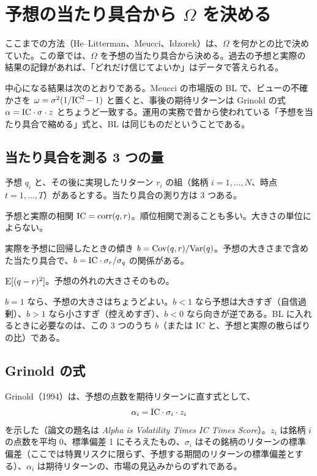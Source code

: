 \chapter{予想の当たり具合から $\Omega$ を決める}\label{ch:accuracy}

ここまでの方法（He--Litterman、Meucci、Idzorek）は、$\Omega$ を何かとの比で決めていた。この章では、$\Omega$ を予想の当たり具合から決める。過去の予想と実際の結果の記録があれば、「どれだけ信じてよいか」はデータで答えられる。

中心になる結果は次のとおりである。Meucci の市場版の BL で、ビューの不確かさを $\omega=\sigma^2(1/\mathrm{IC}^2-1)$ と置くと、事後の期待リターンは Grinold の式 $\alpha=\mathrm{IC}\cdot\sigma\cdot z$ とちょうど一致する。運用の実務で昔から使われている「予想を当たり具合で縮める」式と、BL は同じものだということである。

\section{当たり具合を測る 3 つの量}

予想 $q_i$ と、その後に実現したリターン $r_i$ の組（銘柄 $i=1,\dots,N$、時点 $t=1,\dots,T$）があるとする。当たり具合の測り方は 3 つある。

\begin{description}[leftmargin=2em,style=nextline]
\item[情報係数（IC）] 予想と実際の相関 $\mathrm{IC}=\mathrm{corr}(q,r)$。順位相関で測ることも多い。大きさの単位によらない。
\item[較正の傾き $b$] 実際を予想に回帰したときの傾き $b=\mathrm{Cov}(q,r)/\mathrm{Var}(q)$。予想の大きさまで含めた当たり具合で、$b=\mathrm{IC}\cdot\sigma_r/\sigma_q$ の関係がある。
\item[誤差の 2 乗の平均（MSE）] $\mathrm{E}[(q-r)^2]$。予想の外れの大きさそのもの。
\end{description}

$b=1$ なら、予想の大きさはちょうどよい。$b<1$ なら予想は大きすぎ（自信過剰）、$b>1$ なら小さすぎ（控えめすぎ）、$b<0$ なら向きが逆である。BL に入れるときに必要なのは、この 3 つのうち $b$（または IC と、予想と実際の散らばりの比）である。

\section{Grinold の式}

Grinold（1994）は、予想の点数を期待リターンに直す式として、
\begin{equation}
\alpha_i=\mathrm{IC}\cdot\sigma_i\cdot z_i
\label{eq:grinold}
\end{equation}
を示した（論文の題名は \textit{Alpha is Volatility Times IC Times Score}）。$z_i$ は銘柄 $i$ の点数を平均 0、標準偏差 1 にそろえたもの、$\sigma_i$ はその銘柄のリターンの標準偏差（ここでは特異リスクに限らず、予想する期間のリターンの標準偏差とする）、$\alpha_i$ は期待リターンの、市場の見込みからのずれである。

